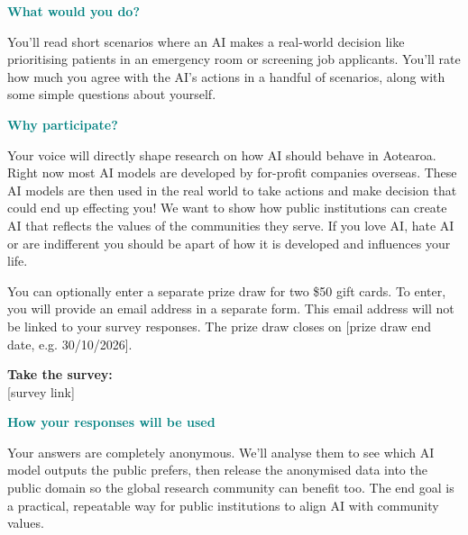 \documentclass[11pt, a4paper]{article}
\begin{document}
\vspace{0.6em}

\noindent\textcolor{teal}{\textbf{What would you do?}}
\small

\noindent You'll read short scenarios where an AI makes a real-world decision like prioritising patients in an emergency room or screening job
applicants. You'll rate how much you agree with the AI's actions in a handful of scenarios, along with some simple questions about yourself.

\vspace{0.4em}

\noindent\textcolor{teal}{\textbf{Why participate?}}
\small

\noindent Your voice will directly shape research on how AI should behave in
Aotearoa. Right now most AI models are developed by for-profit companies
overseas. These AI models are then used in the real world to take actions and make decision that could end up effecting you! We want to show how public institutions can create AI that reflects the values of the communities they
serve. If you love AI, hate AI or are indifferent you should be apart of how it is developed and influences your life.

\vspace{0.4em}

\noindent You can optionally enter a separate prize draw for two \$50
gift cards. To enter, you will provide an email address in a separate form.
This email address will not be linked to your survey responses. The prize
draw closes on [prize draw end date, e.g. 30/10/2026].

\vspace{0.6em}

\noindent\colorbox{teallight}{
  \begin{minipage}{\dimexpr\textwidth-2\fboxsep\relax}
    \centering
    \textbf{\large Take the survey:}\\[4pt]
    \large [survey link] \\[2pt]
  \end{minipage}}

\vspace{0.6em}

\noindent\textcolor{teal}{\textbf{How your responses will be used}}
\small

\noindent Your answers are completely anonymous. We'll analyse them to see
which AI model outputs the public prefers, then release the anonymised data
into the public domain so the global research community can benefit too. The
end goal is a practical, repeatable way for public institutions to align AI
with community values.
\end{document}
